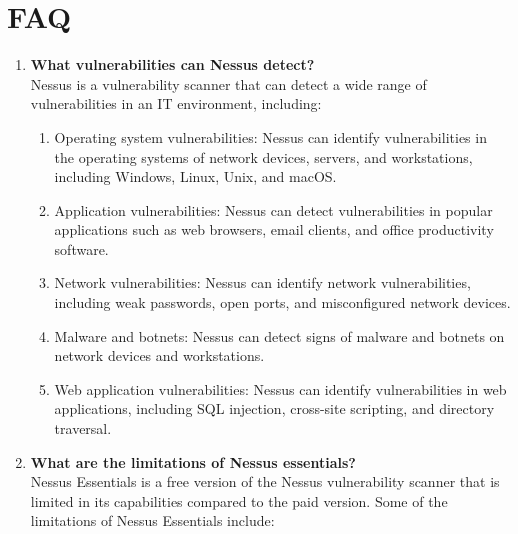 \documentclass[openany]{book}
\begin{document}
\section{FAQ}

\begin{enumerate}

    \item \textbf{What vulnerabilities can Nessus detect?}\\

          Nessus is a vulnerability scanner that can detect a wide range of vulnerabilities in an IT environment, including:

          \begin{enumerate}
              \item Operating system vulnerabilities: Nessus can identify vulnerabilities in the operating systems of network devices, servers, and workstations, including Windows, Linux, Unix, and macOS.
              \item Application vulnerabilities: Nessus can detect vulnerabilities in popular applications such as web browsers, email clients, and office productivity software.
              \item Network vulnerabilities: Nessus can identify network vulnerabilities, including weak passwords, open ports, and misconfigured network devices.
              \item Malware and botnets: Nessus can detect signs of malware and botnets on network devices and workstations.
              \item Web application vulnerabilities: Nessus can identify vulnerabilities in web applications, including SQL injection, cross-site scripting, and directory traversal.
          \end{enumerate}
    \item \textbf{What are the limitations of Nessus essentials?}\\

          Nessus Essentials is a free version of the Nessus vulnerability scanner that is limited in its capabilities compared to the paid version. Some of the limitations of Nessus Essentials include:


\end{enumerate}
\end{document}
